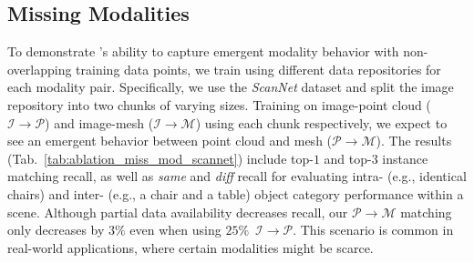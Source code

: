 \subsection{Missing Modalities}
\label{sec:missing_modalities}
To demonstrate \project{}'s ability to capture emergent modality behavior with non-overlapping training data points, we train \project{} using different data repositories for each modality pair. Specifically, we use the \textit{ScanNet} dataset and split the image repository into two chunks of varying sizes. Training on image-point cloud ($\mathcal{I} \rightarrow \mathcal{P}$) and image-mesh ($\mathcal{I} \rightarrow \mathcal{M}$) using each chunk respectively, we expect to see an emergent behavior between point cloud and mesh ($\mathcal{P} \rightarrow \mathcal{M}$). The results (Tab.~\ref{tab:ablation_miss_mod_scannet}) include top-$1$ and top-$3$ instance matching recall, as well as \textit{same} and \textit{diff} recall for evaluating intra- (e.g., identical chairs) and inter- (e.g., a chair and a table) object category performance within a scene. Although partial data availability decreases recall, our $\mathcal{P} \rightarrow \mathcal{M}$ matching only decreases by $3\%$ even when using $25\%$~$\mathcal{I} \rightarrow \mathcal{P}$. This scenario is common in real-world applications, where certain modalities might be scarce.

